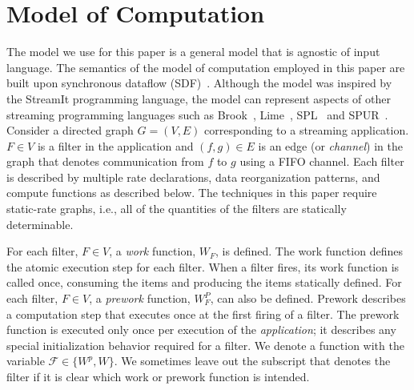 \section{Model of Computation}
\label{model}

The model we use for this paper is a general model that is agnostic of
input language.  The semantics of the model of computation employed in
this paper are built upon synchronous dataflow (SDF)~\cite{leeSDF}.
Although the model was inspired by the StreamIt programming language,
the model can represent aspects of other streaming programming
languages such as Brook~\cite{brook04}, Lime~\cite{lime10},
SPL~\cite{spl09} and SPUR~\cite{spur05samos}.  Consider a directed
graph $G = (V, E)$ corresponding to a streaming application. $F \in V$
is a filter in the application and $(f, g) \in E$ is an edge (or {\it
  channel}) in the graph that denotes communication from $f$ to $g$
using a FIFO channel.  Each filter is described by multiple rate
declarations, data reorganization patterns, and compute functions as
described below. The techniques in this paper require static-rate
graphs, i.e., all of the quantities of the filters are statically
determinable.



For each filter, $F \in V$, a {\it work} function, $W_F$, is defined.
The work function defines the atomic execution step for each filter.
When a filter fires, its work function is called once, consuming the
items and producing the items statically defined.  For each filter, $F
\in V$, a {\it prework} function, $W_F^P$, can also be defined.
Prework describes a computation step that executes once at the first
firing of a filter.  The prework function is executed only once per
execution of the {\it application}; it describes any special
initialization behavior required for a filter. We denote a function
with the variable $\mathcal{F} \in \{W^p, W\}$.  We sometimes leave
out the subscript that denotes the filter if it is clear which work or
prework function is intended.

